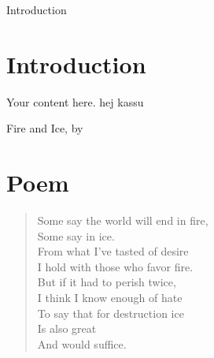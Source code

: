 \begin{frame}{Introduction}
  \section{Introduction}

  Your content here.
    hej kassu 
\end{frame}


\begin{frame}{Fire and Ice, by \citet{Frost1920}}
  \section{Poem}
  \center
  \begin{verse} 
     Some say the world will end in fire, \\
     \hspace{1cm}Some say in ice.\\
     From what I've tasted of desire \\
     I hold with those who favor fire.\\
     \hspace{1cm}But if it had to perish twice,\\
     I think I know enough of hate\\
     \hspace{1cm}To say that for destruction ice\\
     Is also great\\
     \hspace{1cm}And would suffice. 
\end{verse}
\end{frame}       
